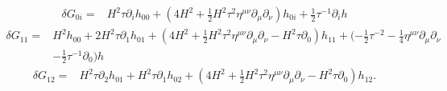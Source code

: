 \documentclass[10pt,letterpaper]{article}
\begin{document}
\begin{align}
\delta G_{0i}={}&H^2 \tau \partial_{i} h_{00}
 + (4 H^2
 + \tfrac{1}{2} H^2 \tau^2 \eta^{\mu \nu} \partial_{\mu} \partial_{\nu}) h_{0i}
 + \tfrac{1}{2} \tau^{-1} \partial_{i} h
\end{align}
\begin{align}
\delta G_{11}={}&H^2 h_{00}
 + 2 H^2 \tau \partial_{1} h_{01}
 + (4 H^2
 + \tfrac{1}{2} H^2 \tau^2 \eta^{\mu \nu} \partial_{\mu} \partial_{\nu}
 -  H^2 \tau \partial_{0}) h_{11}
 + (- \tfrac{1}{2} \tau^{-2}
 -  \tfrac{1}{4} \eta^{\mu \nu} \partial_{\mu} \partial_{\nu}\nonumber\\
& -  \tfrac{1}{2} \tau^{-1} \partial_{0}) h
\end{align}
\begin{align}
\delta G_{12}={}&H^2 \tau \partial_{2} h_{01}
 + H^2 \tau \partial_{1} h_{02}
 + (4 H^2
 + \tfrac{1}{2} H^2 \tau^2 \eta^{\mu \nu} \partial_{\mu} \partial_{\nu}
 -  H^2 \tau \partial_{0}) h_{12}.
\end{align}
\\ \\
\end{document}
